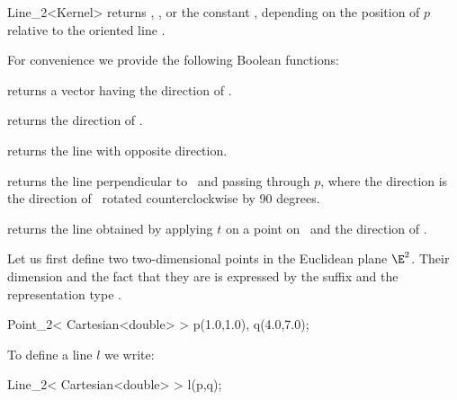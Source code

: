 \begin{ccRefClass} {Line_2<Kernel>}
       {returns ,
        , or the constant
        ,
        depending on the position of $p$  relative to the oriented line \ccVar.
        }


For convenience we provide the following Boolean functions:

       {}
\ccGlue
{}
       {}
\ccGlue
{}
       {}


       {returns a vector having the direction of \ccVar.}

       {returns the direction of \ccVar.}

       {returns the line with opposite direction.}

        {returns the line perpendicular to \ccVar\ and passing through $p$,
         where the direction is the direction of \ccVar\ rotated 
         counterclockwise by 90 degrees.}

       {returns the line obtained by applying $t$ on a point on \ccVar\ 
        and the direction of \ccVar.}



\ccExample
Let us first define two  two-dimensional points in the Euclidean 
plane $\E^2$. Their
dimension and the fact that they are  is expressed by
the suffix \ccStyle{_2} and the representation type \ccStyle{Cartesian}.

\begin{cprog}

  Point_2< Cartesian<double> >  p(1.0,1.0), q(4.0,7.0);
\end{cprog} 

To define a line $l$ we write:

\begin{cprog}

  Line_2< Cartesian<double> > l(p,q);
\end{cprog} 

\ccSeeAlso
{} \\

\end{ccRefClass} 
